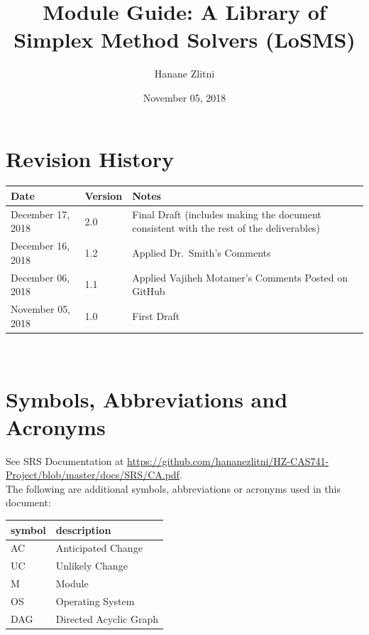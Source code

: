 \documentclass[12pt, titlepage]{article}
\newcommand{\famname}{LoSMS} %
\begin{document}
\title{Module Guide: A Library of Simplex Method Solvers (\famname{}) } 
\author{Hanane Zlitni}
\date{November 05, 2018}

\maketitle


\section{Revision History}

\begin{tabularx}{\textwidth}{p{3cm}p{2cm}X}
\toprule {\bf Date} & {\bf Version} & {\bf Notes}\\
\midrule
December 17, 2018 & 2.0 & Final Draft (includes making the document consistent 
with the rest of the deliverables)\\
December 16, 2018 & 1.2 & Applied Dr.~Smith’s Comments\\
December 06, 2018 & 1.1 & Applied Vajiheh Motamer's Comments Posted on GitHub\\
November 05, 2018 & 1.0 & First Draft\\
\bottomrule
\end{tabularx}

~\newpage

\section{Symbols, Abbreviations and Acronyms}

See SRS Documentation at 
\url{https://github.com/hananezlitni/HZ-CAS741-Project/blob/master/docs/SRS/CA.pdf}.
\\

The following are additional symbols, abbreviations or acronyms used in this 
document: \\

\renewcommand{\arraystretch}{1.2}
\begin{tabular}{l l} 
	\toprule		
	\textbf{symbol} & \textbf{description}\\
	\midrule 
	AC & Anticipated Change\\
	UC & Unlikely Change\\
	M & Module\\
	OS & Operating System\\
	DAG & Directed Acyclic Graph\\
	\bottomrule
\end{tabular}\\
\end{document}
